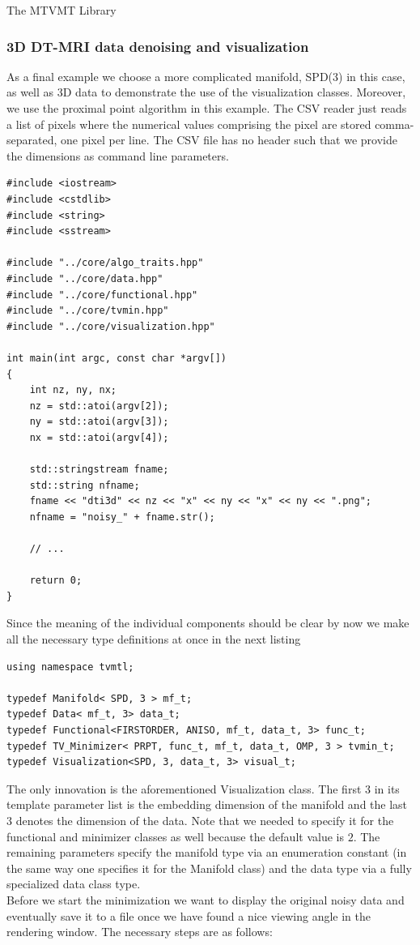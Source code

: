 \begin{chapter}{The MTVMT Library}
\subsubsection{3D DT-MRI data denoising and visualization} %
\label{ssub:dti_tut}
As a final example we choose a more complicated manifold, SPD(3) in this case, as well as 3D data to demonstrate the use of the visualization classes. Moreover, we use
the proximal point algorithm in this example. The CSV reader just reads a list of pixels where the numerical values comprising the pixel are stored comma-separated, one pixel
per line. The CSV file has no header such that we provide the dimensions as command line parameters.

\cppinline
\begin{lstlisting}[label=code:tut3_init,caption={Initialization}]
#include <iostream>
#include <cstdlib>
#include <string>
#include <sstream>

#include "../core/algo_traits.hpp"
#include "../core/data.hpp"
#include "../core/functional.hpp"
#include "../core/tvmin.hpp"
#include "../core/visualization.hpp"

int main(int argc, const char *argv[])
{       
    int nz, ny, nx;
    nz = std::atoi(argv[2]);
    ny = std::atoi(argv[3]);
    nx = std::atoi(argv[4]);

    std::stringstream fname;
    std::string nfname;
    fname << "dti3d" << nz << "x" << ny << "x" << ny << ".png";
    nfname = "noisy_" + fname.str();
    
    // ...

    return 0;    
}
\end{lstlisting}
	
Since the meaning of the individual components should be clear by now we make all the necessary type definitions at once in the next listing\\
\cppinline
\begin{lstlisting}[label=code:tut3_typdefinitions,caption={Type definitions, Visualization type}]
using namespace tvmtl;

typedef Manifold< SPD, 3 > mf_t;
typedef Data< mf_t, 3> data_t;
typedef Functional<FIRSTORDER, ANISO, mf_t, data_t, 3> func_t;
typedef TV_Minimizer< PRPT, func_t, mf_t, data_t, OMP, 3 > tvmin_t;
typedef Visualization<SPD, 3, data_t, 3> visual_t;
\end{lstlisting}

The only innovation is the aforementioned Visualization class. The first $3$ in its template parameter list is the embedding dimension of the manifold 
and the last $3$ denotes the dimension of the data. Note that we needed to specify it for the functional and minimizer classes as well because the default value is $2$. 
The remaining parameters specify the manifold type via an enumeration constant (in the same way one specifies it for the Manifold class) and the data type via a fully
specialized data class type.\\
Before we start the minimization we want to display the original noisy data and eventually save it to a file once we have found a nice viewing angle in the rendering window.
The necessary steps are as follows:\\


\end{chapter}
